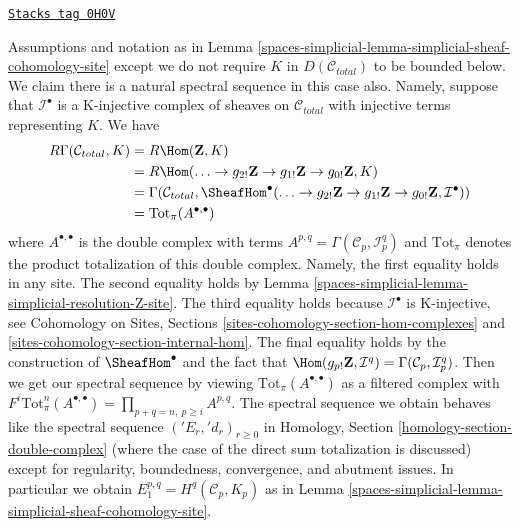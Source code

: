 \begin{remark}
\label{spaces-simplicial-remark-simplicial-cohomology-site}
\href{https://stacks.math.columbia.edu/tag/0H0V}{\texttt{Stacks tag 0H0V}}

Assumptions and notation as in
Lemma \ref{spaces-simplicial-lemma-simplicial-sheaf-cohomology-site}
except we do not require $K$ in $D(\mathcal{C}_{total})$
to be bounded below. We claim there is a natural
spectral sequence in this case also. Namely, suppose
that $\mathcal{I}^\bullet$ is a K-injective complex of sheaves on
$\mathcal{C}_{total}$ with injective terms representing $K$.
We have
\begin{align*}
R\Gamma(\mathcal{C}_{total}, K)
& =
R\Hom(\mathbf{Z}, K) \\
& =
R\Hom(
\ldots \to g_{2!}\mathbf{Z} \to g_{1!}\mathbf{Z} \to g_{0!}\mathbf{Z}, K) \\
& =
\Gamma(\mathcal{C}_{total},
\SheafHom^\bullet(
\ldots \to g_{2!}\mathbf{Z} \to g_{1!}\mathbf{Z} \to g_{0!}\mathbf{Z},
\mathcal{I}^\bullet)) \\
& =
\text{Tot}_\pi(A^{\bullet, \bullet})
\end{align*}
where $A^{\bullet, \bullet}$ is the double complex with terms
$A^{p, q} = \Gamma(\mathcal{C}_p, \mathcal{I}^q_p)$ and $\text{Tot}_\pi$
denotes the product totalization of this double complex.
Namely, the first equality holds in any site. The second equality
holds by Lemma \ref{spaces-simplicial-lemma-simplicial-resolution-Z-site}.
The third equality holds because $\mathcal{I}^\bullet$ is K-injective, see
Cohomology on Sites, Sections \ref{sites-cohomology-section-hom-complexes}
and \ref{sites-cohomology-section-internal-hom}.
The final equality holds by the construction of $\SheafHom^\bullet$
and the fact that $\Hom(g_{p!}\mathbf{Z}, \mathcal{I}^q) =
\Gamma(\mathcal{C}_p, \mathcal{I}^q_p)$.
Then we get our spectral sequence by viewing
$\text{Tot}_\pi(A^{\bullet, \bullet})$ as a filtered
complex with $F^i\text{Tot}^n_\pi(A^{\bullet, \bullet}) =
\prod_{p + q = n,\ p \geq i} A^{p, q}$. The spectral sequence
we obtain behaves like the spectral sequence $({}'E_r, {}'d_r)_{r \geq 0}$ in
Homology, Section \ref{homology-section-double-complex}
(where the case of the direct sum totalization
is discussed) except for regularity, boundedness, convergence, and
abutment issues. In particular we obtain $E_1^{p, q} = H^q(\mathcal{C}_p, K_p)$
as in Lemma \ref{spaces-simplicial-lemma-simplicial-sheaf-cohomology-site}.
\end{remark}

